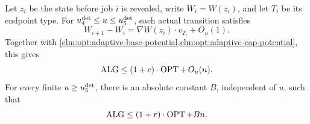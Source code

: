 \begin{claim}
\label{clm:opt:adaptive-finite}
Let $z_i$ be the state before job $i$ is revealed, write $W_i=W(z_i)$, and
let $T_i$ be its endpoint type.  For $u_{4}^{\mathrm{det}}\le u\le u_{5}^{\mathrm{det}}$, each actual
transition satisfies
\[
 W_{i+1}-W_i
 =\nabla W(z_i)\mathbin{\cdot}v_{T_i}+O_u(1).
\]
Together with
\cref{clm:opt:adaptive-base-potential,clm:opt:adaptive-cap-potential}, this
gives
\begin{equation}
 \operatorname{ALG}\le(1+c)\cdot\operatorname{OPT}+\,O_u(n).
 \label{eq:opt:adaptive-finite-claim}
\end{equation}
For every finite $u\ge u_{5}^{\mathrm{det}}$, there is an absolute constant $B$,
independent of $u$, such that
\begin{equation}
 \operatorname{ALG}\le(1+r)\cdot\operatorname{OPT}+Bn.
 \label{eq:opt:adaptive-uniform-claim}
\end{equation}
\end{claim}

